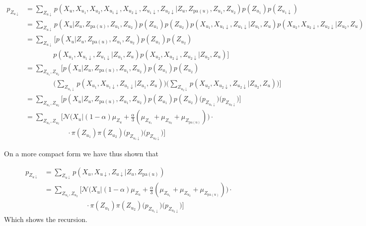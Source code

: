 \documentclass[11pt,oneside,a4paper]{article}
\theoremstyle{definition}
\theoremstyle{remark}
\begin{document}
\begin{align}
  p_{Z_{u \downarrow}} & = \sum_{Z_{u \downarrow}} p(X_u, X_{u_1}, X_{u_2}, X_{u_1 \downarrow}, X_{u_2 \downarrow}, Z_{u_1 \downarrow}, Z_{u_2 \downarrow}|Z_u, Z_{\text{pa}(u)}, Z_{u_1}, Z_{u_2})p(Z_{u_1}) p(Z_{u_1\downarrow}) \nonumber \\
  & = \sum_{Z_{u \downarrow}} p(X_u|Z_u, Z_{\text{pa}(u)}, Z_{u_1}, Z_{u_2}) p(Z_{u_1})p(Z_{u_2})p(X_{u_1}, X_{u_1\downarrow}, Z_{u_1\downarrow}|Z_{u_1}, Z_u) p(X_{u_2}, X_{u_2\downarrow}, Z_{u_2\downarrow}|Z_{u_2}, Z_u) \nonumber\\
  & = \sum_{Z_{u \downarrow}} \bigg[ p(X_u|Z_u, Z_{\text{pa}(u)}, Z_{u_1}, Z_{u_2})p(Z_{u_1})p(Z_{u_2}) \nonumber\\
  & \qquad\qquad p(X_{u_1}, X_{u_1\downarrow}, Z_{u_1\downarrow}|Z_{u_1}, Z_u) p(X_{u_2}, X_{u_2\downarrow}, Z_{u_2\downarrow}|Z_{u_2}, Z_u) \bigg] \nonumber\\
  & = \sum_{Z_{u_1}, Z_{u_2}} \bigg[ p(X_u|Z_u, Z_{\text{pa}(u)}, Z_{u_1}, Z_{u_2})p(Z_{u_1})p(Z_{u_2}) \nonumber\\
  & \qquad\qquad
  \Big( \sum_{Z_{u_1\downarrow}} p(X_{u_1}, X_{u_1\downarrow}, Z_{u_1\downarrow}|Z_{u_1}, Z_u) \Big)
  \Big( \sum_{Z_{u_2\downarrow}} p(X_{u_2}, X_{u_2\downarrow}, Z_{u_2\downarrow}|Z_{u_2}, Z_u)\Big) \bigg] \nonumber\\
  & = \sum_{Z_{u_1}, Z_{u_2}} \bigg[ p(X_u|Z_u, Z_{\text{pa}(u)}, Z_{u_1}, Z_{u_2})p(Z_{u_1})p(Z_{u_2}) \Big(p_{Z_{u_1\downarrow}}\Big) \Big( p_{Z_{u_2\downarrow}}\Big)\bigg] \nonumber \\
  & = \sum_{Z_{u_1}, Z_{u_2}} \bigg[ \mathcal{N}\Big(X_u|(1-\alpha)\mu_{Z_u} +\frac{\alpha}{3}(\mu_{Z_{u_1}}+\mu_{Z_{u_2}}+\mu_{Z_{\text{pa}(u)}}) \Big) \cdot \nonumber\\
  & \qquad\qquad\qquad  \cdot \pi(Z_{u_1}) \pi(Z_{u_2}) \Big(p_{Z_{u_1\downarrow}}\Big) \Big( p_{Z_{u_2\downarrow}}\Big)\bigg]\nonumber
\end{align}

On a more compact form we have thus shown that

\begin{align}
  p_{Z_{u \downarrow}} & = \sum_{Z_{u \downarrow}} p(X_u, X_{u \downarrow}, Z_{u \downarrow}|Z_u, Z_{\text{pa}(u)}) \\
  & = \sum_{Z_{u_1}, Z_{u_2}} \bigg[ \mathcal{N}\Big(X_u|(1-\alpha)\mu_{Z_u} +\frac{\alpha}{3}(\mu_{Z_{u_1}}+\mu_{Z_{u_2}}+\mu_{Z_{\text{pa}(u)}}) \Big) \cdot \\
  & \qquad\qquad\qquad  \cdot \pi(Z_{u_1}) \pi(Z_{u_2}) \Big(p_{Z_{u_1\downarrow}}\Big) \Big( p_{Z_{u_2\downarrow}}\Big)\bigg]
\end{align}
Which shows the recursion.
\end{document}

